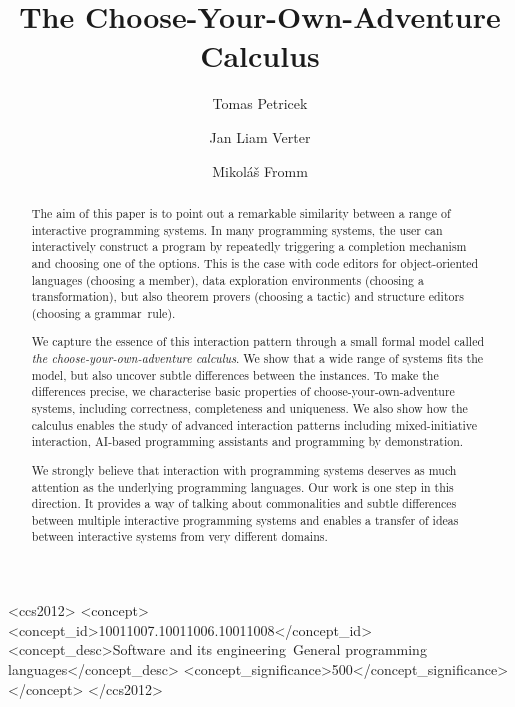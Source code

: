 \documentclass[nonacm,anonymous,sigplan,screen]{acmart}
\begin{document}
\title{The Choose-Your-Own-Adventure Calculus}

\author{Tomas Petricek}

\author{Jan Liam Verter}

\author{Mikol\'{a}\v{s} Fromm}

\renewcommand{\shortauthors}{Petricek et al.}

\begin{abstract}
The aim of this paper is to point out a remarkable similarity between a range of interactive
programming systems. In many programming systems, the user can interactively construct a program by
repeatedly triggering a completion mechanism and choosing one of the options. This
is the case with code editors for object-oriented languages (choosing a member), data
exploration environments (choosing a transformation), but also theorem provers
(choosing a tactic) and structure editors (choosing a grammar~rule).

We capture the essence of this interaction pattern through a small
formal model called \emph{the choose-your-own-adventure calculus}. We show that a wide range
of systems fits the model, but also uncover subtle differences between the instances.
To make the differences precise, we characterise basic properties of choose-your-own-adventure
systems, including correctness, completeness and uniqueness. We also show how the calculus enables
the study of advanced interaction patterns including mixed-initiative interaction,
AI-based programming assistants and programming by demonstration.

We strongly believe that interaction with programming systems deserves as much attention
as the underlying programming languages. Our work is one step in this direction. It provides
a way of talking about commonalities and subtle differences between multiple interactive
programming systems and enables a transfer of ideas between interactive systems from very
different domains.

\end{abstract}

\begin{CCSXML}
<ccs2012>
 <concept>
  <concept_id>10011007.10011006.10011008</concept_id>
  <concept_desc>Software and its engineering~General programming languages</concept_desc>
  <concept_significance>500</concept_significance>
 </concept>
</ccs2012>
\end{CCSXML}
\end{document}
